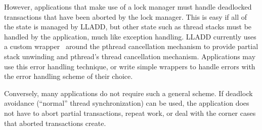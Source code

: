 \documentclass[10pt,letterpaper,twocolumn,english]{article}
\newcommand{\yad}{LLADD\xspace}
\begin{document}


However, applications that
make use of a lock manager must handle deadlocked transactions
that have been aborted by the lock manager.  This is easy if all of
the state is managed by \yad, but other state such as thread stacks
must be handled by the application, much like exception handling.  
\yad currently uses a custom wrapper~\cite{compensations} around the pthread cancellation 
mechanism to provide partial stack unwinding and pthread's thread
cancellation mechanism.  Applications may use this error handling 
technique, or write simple wrappers to handle errors with the 
error handling scheme of their choice.

Conversely, many applications do not require such a general scheme.
If deadlock avoidance (``normal'' thread synchronization) can be used,
the application does not have to abort partial transactions, repeat
work, or deal with the corner cases that aborted transactions create.



\end{document}
